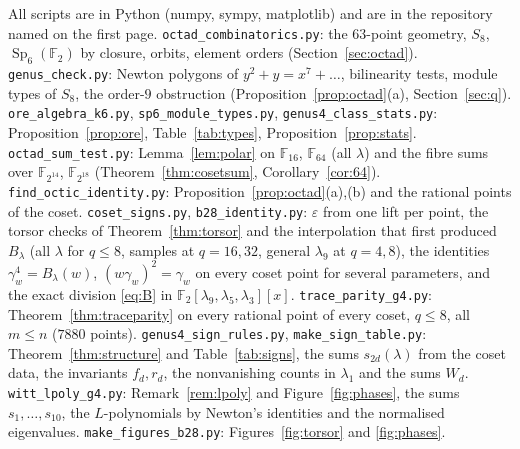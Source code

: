 \documentclass[12pt,a4paper]{amsart}
\theoremstyle{definition}
\newcommand{\F}{\mathbb{F}}
\newcommand{\Sp}{\operatorname{Sp}}
\newcommand{\eps}{\varepsilon}
\begin{document}
All scripts are in Python (numpy, sympy, matplotlib) and are in the repository named on the first page. \texttt{octad\_combinatorics.py}: the $63$-point geometry, $S_8$, $\Sp_6(\F_2)$ by closure, orbits, element orders (Section~\ref{sec:octad}). \texttt{genus\_check.py}: Newton polygons of $y^2+y=x^7+\dots$, bilinearity tests, module types of $S_8$, the order-$9$ obstruction (Proposition~\ref{prop:octad}(a), Section~\ref{sec:q}). \texttt{ore\_algebra\_k6.py}, \texttt{sp6\_module\_types.py}, \texttt{genus4\_class\_stats.py}: Proposition~\ref{prop:ore}, Table~\ref{tab:types}, Proposition~\ref{prop:stats}. \texttt{octad\_sum\_test.py}: Lemma~\ref{lem:polar} on $\F_{16}$, $\F_{64}$ (all $\lambda$) and the fibre sums over $\F_{2^{14}}$, $\F_{2^{18}}$ (Theorem~\ref{thm:cosetsum}, Corollary~\ref{cor:64}). \texttt{find\_octic\_identity.py}: Proposition~\ref{prop:octad}(a),(b) and the rational points of the coset. \texttt{coset\_signs.py}, \texttt{b28\_identity.py}: $\eps$ from one lift per point, the torsor checks of Theorem~\ref{thm:torsor} and the interpolation that first produced $B_\lambda$ (all $\lambda$ for $q\le8$, samples at $q=16,32$, general $\lambda_9$ at $q=4,8$), the identities $\gamma_w^4=B_\lambda(w)$, $(w\gamma_w)^2=\gamma_w$ on every coset point for several parameters, and the exact division \eqref{eq:B} in $\F_2[\lambda_9,\lambda_5,\lambda_3][x]$. \texttt{trace\_parity\_g4.py}: Theorem~\ref{thm:traceparity} on every rational point of every coset, $q\le8$, all $m\le n$ ($7880$ points). \texttt{genus4\_sign\_rules.py}, \texttt{make\_sign\_table.py}: Theorem~\ref{thm:structure} and Table~\ref{tab:signs}, the sums $s_{2d}(\lambda)$ from the coset data, the invariants $f_d,r_d$, the nonvanishing counts in $\lambda_1$ and the sums $W_d$. \texttt{witt\_lpoly\_g4.py}: Remark~\ref{rem:lpoly} and Figure~\ref{fig:phases}, the sums $s_1,\dots,s_{10}$, the $L$-polynomials by Newton's identities and the normalised eigenvalues. \texttt{make\_figures\_b28.py}: Figures~\ref{fig:torsor} and \ref{fig:phases}.
\end{document}
